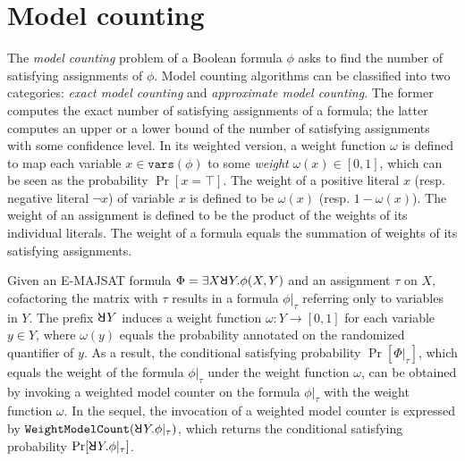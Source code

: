 \section{Model counting}
\label{sect:model-counting}

The \textit{model counting} problem of a Boolean formula $\phi$ asks to find the number of satisfying assignments of $\phi$.
Model counting algorithms can be classified into two categories: \textit{exact model counting} and \textit{approximate model counting}.
The former computes the exact number of satisfying assignments of a formula; the latter computes an upper or a lower bound of the number of satisfying assignments with some confidence level.
In its weighted version, a weight function $\omega$ is defined to map each variable $x \in \mathtt{vars}(\phi)$ to some \emph{weight} $\omega(x) \in [0,1]$, which can be seen as the probability $\Pr[x=\top]$.
The weight of a positive literal $x$ (resp. negative literal $\neg x$) of variable $x$ is defined to be $\omega(x)$ (resp. $1-\omega(x)$).
The weight of an assignment is defined to be the product of the weights of its individual literals.
The weight of a formula equals the summation of weights of its satisfying assignments.

Given an E-MAJSAT formula $\Phi=\exists X \random{} Y. \phi(X,Y)$ and an assignment $\tau$ on $X$, cofactoring the matrix with $\tau$ results in a formula $\phi|_{\tau}$ referring only to variables in $Y$.
The prefix $\random{} Y$ induces a weight function $\omega: Y \rightarrow [0,1]$ for each variable $y \in Y$, where $\omega(y)$ equals the probability annotated on the randomized quantifier of $y$.
As a result, the conditional satisfying probability $\Pr[\Phi|_{\tau}]$, which equals the weight of the formula $\phi|_{\tau}$ under the weight function $\omega$, can be obtained by invoking a weighted model counter on the formula $\phi|_{\tau}$ with the weight function $\omega$.
In the sequel, the invocation of a weighted model counter is expressed by $\mathtt{WeightModelCount}(\random{} Y. \phi|_{\tau})$, which returns the conditional satisfying probability $\Pr[\random{} Y. \phi|_{\tau}]$.

